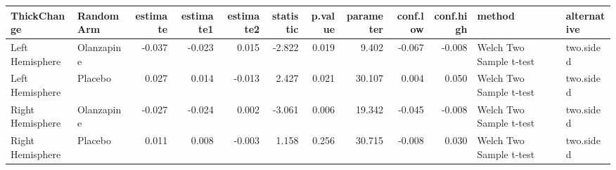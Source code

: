 \documentclass[]{article}
\newenvironment{Shaded}{\begin{snugshade}}{\end{snugshade}}
\newcommand{\KeywordTok}[1]{\textcolor[rgb]{0.13,0.29,0.53}{\textbf{#1}}}
\newcommand{\DataTypeTok}[1]{\textcolor[rgb]{0.13,0.29,0.53}{#1}}
\newcommand{\DecValTok}[1]{\textcolor[rgb]{0.00,0.00,0.81}{#1}}
\newcommand{\StringTok}[1]{\textcolor[rgb]{0.31,0.60,0.02}{#1}}
\newcommand{\OtherTok}[1]{\textcolor[rgb]{0.56,0.35,0.01}{#1}}
\newcommand{\OperatorTok}[1]{\textcolor[rgb]{0.81,0.36,0.00}{\textbf{#1}}}
\newcommand{\NormalTok}[1]{#1}
\theoremstyle{definition}
\theoremstyle{definition}
\theoremstyle{definition}
\theoremstyle{remark}
\begin{document}
\begin{Shaded}
\end{Shaded}

\begin{tabular}{l|l|r|r|r|r|r|r|r|r|l|l}
\hline
ThickChange & RandomArm & estimate & estimate1 & estimate2 & statistic & p.value & parameter & conf.low & conf.high & method & alternative\\
\hline
Left Hemisphere & Olanzapine & -0.037 & -0.023 & 0.015 & -2.822 & 0.019 & 9.402 & -0.067 & -0.008 & Welch Two Sample t-test & two.sided\\
\hline
Left Hemisphere & Placebo & 0.027 & 0.014 & -0.013 & 2.427 & 0.021 & 30.107 & 0.004 & 0.050 & Welch Two Sample t-test & two.sided\\
\hline
Right Hemisphere & Olanzapine & -0.027 & -0.024 & 0.002 & -3.061 & 0.006 & 19.342 & -0.045 & -0.008 & Welch Two Sample t-test & two.sided\\
\hline
Right Hemisphere & Placebo & 0.011 & 0.008 & -0.003 & 1.158 & 0.256 & 30.715 & -0.008 & 0.030 & Welch Two Sample t-test & two.sided\\
\hline
\end{tabular}
\end{document}
